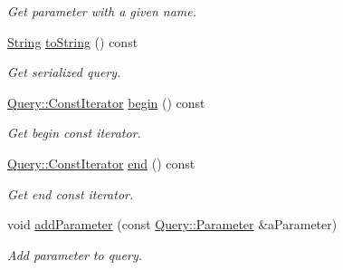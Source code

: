 \begin{DoxyCompactItemize}
\begin{DoxyCompactList}\small\item\em Get parameter with a given name. \end{DoxyCompactList}\item 
\hyperlink{namespacelibrary_1_1io_a7469b45835a4421045db344d6a5a1f85}{String} \hyperlink{classlibrary_1_1io_1_1url_1_1_query_af38369d995520735ef60f28a949f1d6d}{to\+String} () const
\begin{DoxyCompactList}\small\item\em Get serialized query. \end{DoxyCompactList}\item 
\hyperlink{classlibrary_1_1io_1_1url_1_1_query_a244b3517cf5a3d1abf7e8c8d9d40cf04}{Query\+::\+Const\+Iterator} \hyperlink{classlibrary_1_1io_1_1url_1_1_query_a598fb9d455508308210e5cd12bca0d01}{begin} () const
\begin{DoxyCompactList}\small\item\em Get begin const iterator. \end{DoxyCompactList}\item 
\hyperlink{classlibrary_1_1io_1_1url_1_1_query_a244b3517cf5a3d1abf7e8c8d9d40cf04}{Query\+::\+Const\+Iterator} \hyperlink{classlibrary_1_1io_1_1url_1_1_query_ac88e26c91e0d31da540933d0892145d5}{end} () const
\begin{DoxyCompactList}\small\item\em Get end const iterator. \end{DoxyCompactList}\item 
void \hyperlink{classlibrary_1_1io_1_1url_1_1_query_aaaae1184a15d06b061dc38e779fb834e}{add\+Parameter} (const \hyperlink{classlibrary_1_1io_1_1url_1_1_query_1_1_parameter}{Query\+::\+Parameter} \&a\+Parameter)
\begin{DoxyCompactList}\small\item\em Add parameter to query. \end{DoxyCompactList}\end{DoxyCompactItemize}
